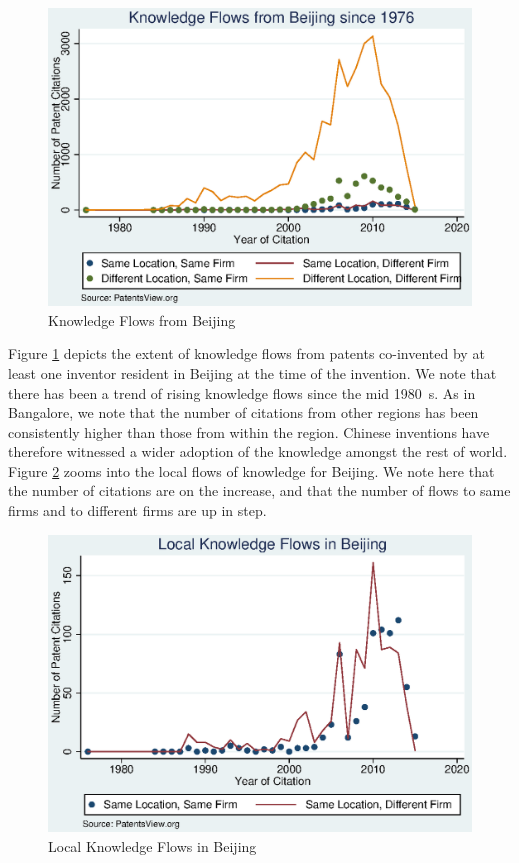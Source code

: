 \documentclass[12pt]{article}
\begin{document}
\begin{figure}[h]
\begin{centering}
  \includegraphics[width=\textwidth]{Beijing1976}
  \caption{Knowledge Flows from Beijing}
   \label{fig:Beijing1976}
\end{centering}
\end{figure}


Figure \ref{fig:Beijing1976} depicts the extent of knowledge flows from patents co-invented by at least one inventor resident in Beijing at the time of the invention. We note that there has been a trend of rising knowledge flows since the mid 1980\textquotesingle\ s. As in Bangalore, we note that the number of citations from other regions has been consistently higher than those from within the region. Chinese inventions have therefore witnessed  a wider adoption of the knowledge amongst the rest of world. Figure \ref{fig:BeijingLocal1976} zooms into the local flows of knowledge for Beijing. We note here that the number of citations are on the increase, and that the number of flows to same firms and to different firms are up in step. 

\begin{figure}[h]
\begin{centering}
  \includegraphics[width=\textwidth]{BeijingLocal1976}
  \caption{Local Knowledge Flows in Beijing}
   \label{fig:BeijingLocal1976}
\end{centering}
\end{figure}
\end{document}
